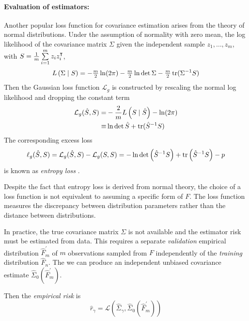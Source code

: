 \paragraph{Evaluation of estimators:}
Another popular loss  function for covariance estimation arises from the theory of normal distributions.  Under the assumption of normality  with zero mean, the log likelihood of the covariance matrix $\Sigma$ given the independent sample $z_1,\ldots,z_m$, with $S = \tfrac 1 m \sum\limits_{i=1}^m z_i z_i^\intercal$,  
\begin{equation}
L\left(\Sigma \mid S\right) = -\tfrac m 2 \ln(2\pi) - \tfrac m 2 \ln \det \Sigma - \tfrac m 2 \operatorname{tr}(\Sigma^{-1} S)
\end{equation}
Then the Gaussian loss function $\mathcal L_g$ is constructed by rescaling the normal log likelihood and dropping the constant term
\begin{equation}
\begin{split}
\mathcal L_g(\hat S,S) = &-\frac 2 m L\left(S \mid \hat S \right) - \ln(2\pi) 
\\ 
\equiv & \ln \det \hat S + \operatorname{tr}(\hat S^{-1} S) 
\end{split}
\end{equation}
The corresponding excess loss 
\begin{equation}
\ell_g(\hat S,S) = \mathcal L_g(\hat S,S) - \mathcal L_g(S,S) 
= -\ln \det \left(\hat S^{-1} S\right) + \operatorname{tr}\left(\hat S^{-1}S\right) - p
\end{equation}
is known as \emph{entropy loss} \citep{James:1961}.

Despite the fact that entropy loss is derived from normal theory, the choice of a loss function is not equivalent to assuming a specific form of $F$. The loss function measures the discrepancy between distribution parameters rather than the distance between distributions.  

In practice, the true covariance matrix $\Sigma$ is not available and the estimator risk must be estimated from data. This requires a separate \emph{validation} empirical distribution $\hat F_m^\prime$ of $m$ observations sampled from $F$ independently of the \emph{training} distribution $\hat F_n$. The we can produce an independent unbiased covariance estimate $\hat \Sigma_0(\hat F_m^\prime)$.

Then the \emph{empirical risk} is 
\begin{equation}
\hat r_\gamma = \mathcal L\left(\hat\Sigma_\gamma,\hat\Sigma_0(\hat F_m^\prime)\right) 
\end{equation}

